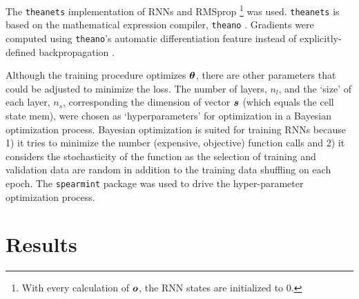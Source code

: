 
The \texttt{theanets} \cite{Johnson2015} implementation of RNNs and RMSprop
\footnote{With every calculation of $\boldsymbol{o}$, the RNN states are initialized to 0.}
was used.
%
\texttt{theanets} is based on the mathematical expression compiler, \texttt{theano} \cite{Bergstra2010}.
%
Gradients were computed using \texttt{theano}'s automatic differentiation feature instead of explicitly-defined backpropagation \cite{Rumelhart1986}.


Although the training procedure optimizes $\boldsymbol{\theta}$, there are other parameters that could be adjusted to minimize the loss.
%
The number of layers, $n_l$, and the `size' of each layer, $n_s$, corresponding the dimension of vector $\boldsymbol{s}$ (which equals the cell state mem), were chosen as `hyperparameters' for optimization in a Bayesian optimization process.
%
Bayesian optimization is suited for training RNNs because
1) it tries to minimize the number (expensive, objective) function calls and
2) it considers the stochasticity of the function as the selection of training and validation data are random in addition to the training data shuffling on each epoch.
%
The \texttt{spearmint} \cite{snoek2012practical} package was used to drive the hyper-parameter optimization process.


\section{Results}




